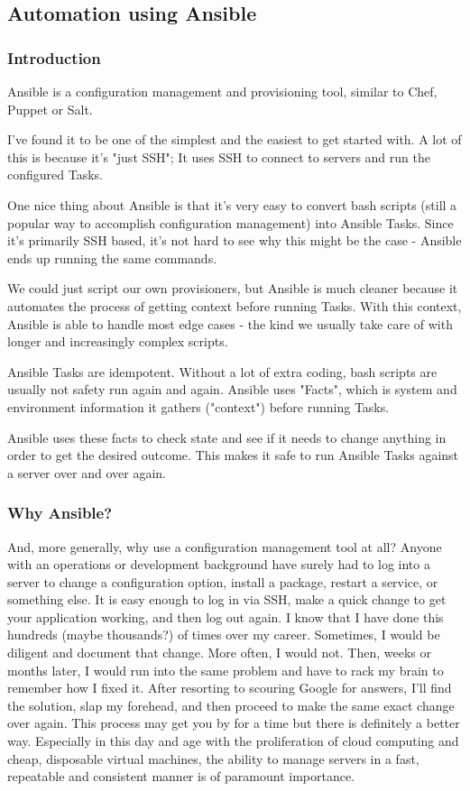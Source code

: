 \documentclass[BTech]{srmuthesis}
\begin{document}
\subsection{Automation using Ansible}

\subsubsection{Introduction}

Ansible is a configuration management and provisioning tool, similar to Chef, Puppet or Salt.

I've found it to be one of the simplest and the easiest to get started with. A lot of this is because it's "just SSH"; It uses SSH to connect to servers and run the configured Tasks.

One nice thing about Ansible is that it's very easy to convert bash scripts (still a popular way to accomplish configuration management) into Ansible Tasks. Since it's primarily SSH based, it's not hard to see why this might be the case - Ansible ends up running the same commands.

We could just script our own provisioners, but Ansible is much cleaner because it automates the process of getting context before running Tasks. With this context, Ansible is able to handle most edge cases - the kind we usually take care of with longer and increasingly complex scripts.

Ansible Tasks are idempotent. Without a lot of extra coding, bash scripts are usually not safety run again and again. Ansible uses "Facts", which is system and environment information it gathers ("context") before running Tasks.

Ansible uses these facts to check state and see if it needs to change anything in order to get the desired outcome. This makes it safe to run Ansible Tasks against a server over and over again.

\subsubsection{Why Ansible?}

And, more generally, why use a configuration management tool at all? Anyone with an operations or development background have surely had to log into a server to change a configuration option, install a package, restart a service, or something else. It is easy enough to log in via SSH, make a quick change to get your application working, and then log out again. I know that I have done this hundreds (maybe thousands?) of times over my career. Sometimes, I would be diligent and document that change. More often, I would not. Then, weeks or months later, I would run into the same problem and have to rack my brain to remember how I fixed it. After resorting to scouring Google for answers, I’ll find the solution, slap my forehead, and then proceed to make the same exact change over again. This process may get you by for a time but there is definitely a better way. Especially in this day and age with the proliferation of cloud computing and cheap, disposable virtual machines, the ability to manage servers in a fast, repeatable and consistent manner is of paramount importance.
\end{document}
